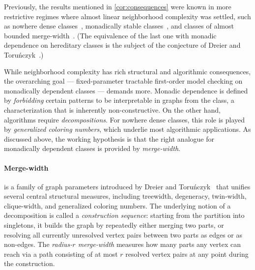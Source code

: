 \documentclass[11pt]{article}
\newtheorem{corollary}[theorem]{Corollary}
\theoremstyle{definition}
\newcommand{\CC}{{\mathscr C}}
\begin{document}

Previously, the results mentioned in \cref{cor:consequences} were known in more restrictive regimes where almost linear neighborhood complexity was settled, such as nowhere dense classes~\cite{EickmeyerGKKPRS17}, monadically stable classes~\cite{stable_MC}, and classes of almost bounded merge-width~\cite{bonamy2025chiboundednessneighbourhoodcomplexitybounded}. (The equivalence of the last one with monadic dependence on hereditary classes is the subject of the conjecture of Dreier and Toru\'nczyk~\cite{mw-mc}.)

While neighborhood complexity has rich structural and algorithmic consequences, the overarching goal --- fixed-parameter tractable first-order model checking on monadically dependent classes --- demands more.
Monadic dependence is defined by \emph{forbidding} certain patterns to be interpretable in graphs from the class, a characterization that is inherently non-constructive.
On the other hand, algorithms require \emph{decompositions}. For nowhere dense classes, this role is played by \emph{generalized coloring numbers}, which underlie most algorithmic applications. As discussed above, the working hypothesis is that the right analogue for monadically dependent classes is provided by \emph{merge-width}.

\paragraph{Merge-width\!\!}
    is a family of graph parameters introduced by Dreier and Toru\'nczyk~\cite{mw-mc} that unifies several central structural measures, including treewidth, degeneracy, twin-width, clique-width, and generalized coloring numbers. The underlying notion of a decomposition is called a \emph{construction sequence}: starting from the partition into singletons, it builds the graph by repeatedly either merging two parts, or resolving all currently unresolved vertex pairs between two parts as edges or as non-edges. The \emph{\mbox{radius-$r$} merge-width} measures how many parts any vertex can reach via a path consisting of at most $r$ resolved vertex pairs at any point during the construction.
\end{document}
